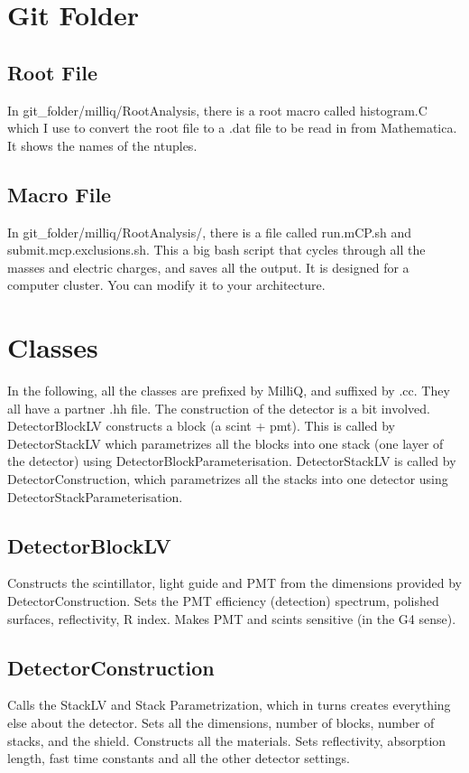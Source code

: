 \documentclass[prd,noshowpacs,nofootinbib,amsmath,amssymb,superscriptaddress]{revtex4}
\begin{document}
\section{Git Folder}
\subsection{Root File}
In git\_folder/milliq/RootAnalysis, there is a root macro called histogram.C which I use to convert the root file to a 
.dat file to be read in from Mathematica. It shows the names of the ntuples.
\subsection{Macro File} 
In git\_folder/milliq/RootAnalysis/, there is a file called run.mCP.sh and submit.mcp.exclusions.sh. 
This a big bash script that cycles through all the masses and electric charges, and saves all the output. 
It is designed for a computer cluster. You can modify it to your architecture. 

\section{Classes}
In the following, all the classes are prefixed by MilliQ, and suffixed by .cc. They all have a partner .hh file.
The construction of the detector is a bit involved. DetectorBlockLV constructs a block (a scint + pmt). This is called by 
DetectorStackLV which parametrizes all the blocks into one stack (one layer of the detector) using DetectorBlockParameterisation.
DetectorStackLV is called by DetectorConstruction, which parametrizes all the stacks into one detector using DetectorStackParameterisation.
\subsection{DetectorBlockLV}
Constructs the scintillator, light guide and PMT from the dimensions provided by DetectorConstruction. 
Sets the PMT efficiency (detection) spectrum, polished surfaces, reflectivity, R index. 
Makes PMT and scints sensitive (in the G4 sense).
\subsection{DetectorConstruction}
Calls the StackLV and Stack Parametrization, which in turns creates everything else about the detector.
Sets all the dimensions, number of blocks, number of stacks, and the shield. Constructs all the materials.
Sets reflectivity, absorption length, fast time constants and all the other detector settings.
\end{document}
